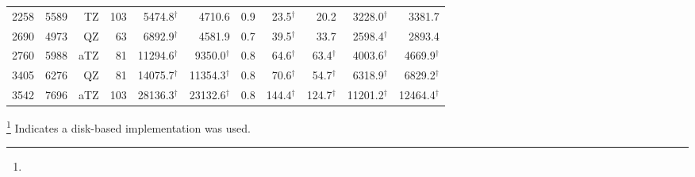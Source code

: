 \begin{table}[H]
\begin{tabular}{lrrrrrrrrrr}
2258& 5589&    TZ&   103&  5474.8$^{\dagger}$ &             4710.6&     0.9 &   23.5$^{\dagger}$ &               20.2&  3228.0$^{\dagger}$&              3381.7\\
2690& 4973&    QZ&    63&  6892.9$^{\dagger}$ &             4581.9&     0.7 &   39.5$^{\dagger}$ &               33.7&  2598.4$^{\dagger}$&              2893.4\\
2760& 5988&   aTZ&    81& 11294.6$^{\dagger}$ & 9350.0$^{\dagger}$&     0.8 &   64.6$^{\dagger}$ &   63.4$^{\dagger}$&  4003.6$^{\dagger}$&  4669.9$^{\dagger}$\\
3405& 6276&    QZ&    81& 14075.7$^{\dagger}$ &11354.3$^{\dagger}$&     0.8 &   70.6$^{\dagger}$ &   54.7$^{\dagger}$&  6318.9$^{\dagger}$&  6829.2$^{\dagger}$\\
3542& 7696&   aTZ&   103& 28136.3$^{\dagger}$ &23132.6$^{\dagger}$&     0.8 &  144.4$^{\dagger}$ &  124.7$^{\dagger}$& 11201.2$^{\dagger}$& 12464.4$^{\dagger}$\\

\hline
\end{tabular}
\renewcommand{\thefootnote}{\fnsymbol{footnote}}
\footnote[2]{} Indicates a disk-based implementation was used.
\end{table}
\endgroup


